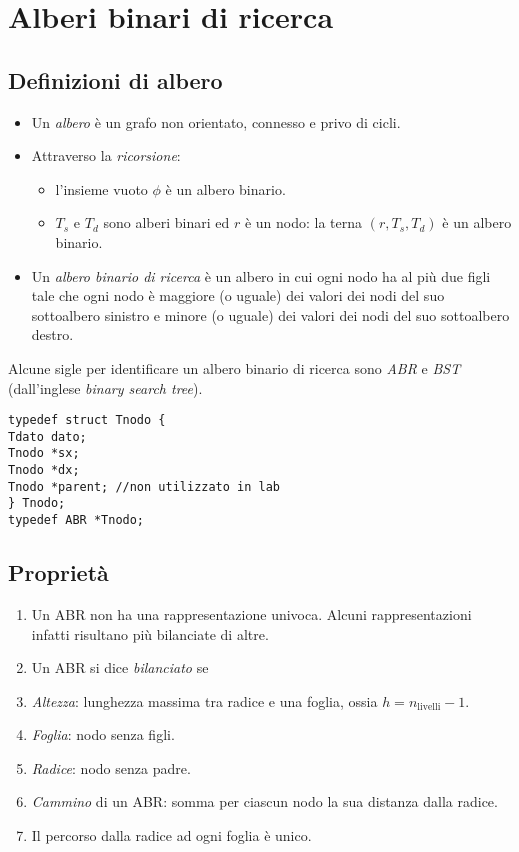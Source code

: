 \chapter{Alberi binari di ricerca}

\section{Definizioni di albero}
\begin{itemize}[noitemsep]
	\item Un \textit{albero} è un grafo non orientato, connesso e privo di cicli.
	\item Attraverso la \textit{ricorsione}:
	\begin{itemize}[noitemsep, nolistsep]
		\item l'insieme vuoto $\phi$ è un albero binario.
		\item $T_s$ e $T_d$ sono alberi binari ed $r$ è un nodo: la terna $(r, T_s, T_d)$ è un albero binario.
	\end{itemize}
	\item Un \textit{albero binario di ricerca} è un albero in cui ogni nodo ha al più due figli tale che ogni nodo è maggiore (o uguale) dei valori dei nodi del suo sottoalbero sinistro e minore (o uguale) dei valori dei nodi del suo sottoalbero destro.
\end{itemize}
Alcune sigle per identificare un albero binario di ricerca sono \textit{ABR} e \textit{BST} (dall'inglese \textit{binary search tree}).

\begin{lstlisting}[title={Implementazione di un albero binario di ricerca}]
typedef struct Tnodo {
Tdato dato;
Tnodo *sx;
Tnodo *dx;
Tnodo *parent; //non utilizzato in lab
} Tnodo;
typedef ABR *Tnodo;
\end{lstlisting}

\section{Proprietà}
\begin{enumerate}[noitemsep]
	\item Un ABR non ha una rappresentazione univoca. Alcuni rappresentazioni infatti risultano più bilanciate di altre.
	\item Un ABR si dice \textit{bilanciato} se
	\item \textit{Altezza}: lunghezza massima tra radice e una foglia, ossia $h = n_\text{livelli}-1$.
	\item \textit{Foglia}: nodo senza figli.
	\item \textit{Radice}: nodo senza padre.
	\item \textit{Cammino} di un ABR: somma per ciascun nodo la sua distanza dalla radice.
	\item Il percorso dalla radice ad ogni foglia è unico.
\end{enumerate}


